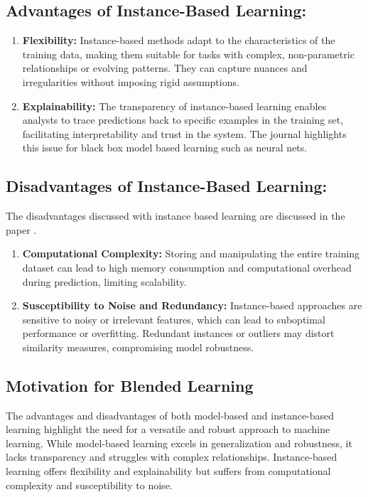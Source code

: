 \documentclass[a4paper, 12pt]{report}
\begin{document}
\subsection{Advantages of Instance-Based Learning:}
\begin{enumerate}
	\item \textbf{Flexibility:} Instance-based methods adapt to the characteristics of the training data, making them suitable for tasks with complex, non-parametric relationships or evolving patterns.
	      They can capture nuances and irregularities without imposing rigid assumptions.
	\item \textbf{Explainability:} The transparency of instance-based learning enables analysts to trace predictions back to specific examples in the training set, facilitating interpretability and trust in the system. 
    The journal \cite{rudin2019stop} highlights this issue for black box model based learning such as neural nets.
\end{enumerate}

\subsection{Disadvantages of Instance-Based Learning:}
The disadvantages discussed with instance based learning are discussed in the paper \cite{aha1991instance}.
\begin{enumerate}
	\item \textbf{Computational Complexity:} Storing and manipulating the entire training dataset can lead to high memory consumption and computational overhead during prediction, limiting scalability.
	\item \textbf{Susceptibility to Noise and Redundancy:} Instance-based approaches are sensitive to noisy or irrelevant features, which can lead to suboptimal performance or overfitting. Redundant instances or outliers may distort similarity measures, compromising model robustness.
\end{enumerate}

\subsection{Motivation for Blended Learning}

The advantages and disadvantages of both model-based and instance-based learning highlight the need for a versatile and robust approach to machine learning.
While model-based learning excels in generalization and robustness, it lacks transparency and struggles with complex relationships.
Instance-based learning offers flexibility and explainability but suffers from computational complexity and susceptibility to noise.
\end{document}
